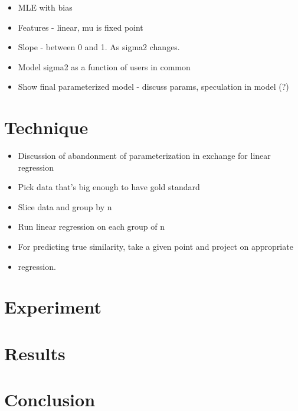 \documentclass[10pt]{article}
\begin{document}
\begin{itemize}
    \item MLE with bias
    \item Features - linear, mu is fixed point
    \item Slope - between 0 and 1. As sigma2 changes. 
    \item Model sigma2 as a function of users in common
    \item Show final parameterized model - discuss params, speculation in model (?)
\end{itemize}

\section*{Technique}

\begin{itemize}
    \item Discussion of abandonment of parameterization in exchange for linear regression
    \item Pick data that's big enough to have gold standard
    \item Slice data and group by n
    \item Run linear regression on each group of n
    \item For predicting true similarity, take a given point and project on appropriate
    \item regression.
\end{itemize}


\section*{Experiment}

\section*{Results}

\section*{Conclusion}
\end{document}
